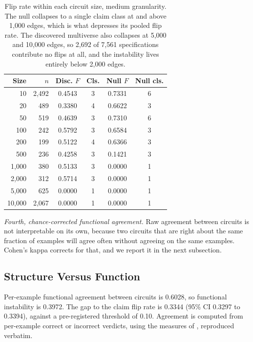 \documentclass[letterpaper]{article} %
\begin{document}
\begin{table}[t]
\centering
\caption{Flip rate within each circuit size, medium granularity. The null
collapses to a single claim class at and above 1{,}000 edges, which is what
depresses its pooled flip rate. The discovered multiverse also collapses at
5{,}000 and 10{,}000 edges, so 2{,}692 of 7{,}561 specifications contribute no
flips at all, and the instability lives entirely below 2{,}000 edges.}
\label{tab:bysize}
\begin{tabular}{rrcccc}
\toprule
Size & $n$ & Disc. $F$ & Cls. & Null $F$ & Null cls. \\
\midrule
10 & 2{,}492 & 0.4543 & 3 & 0.7331 & 6 \\
20 & 489 & 0.3380 & 4 & 0.6622 & 3 \\
50 & 519 & 0.4639 & 3 & 0.7310 & 6 \\
100 & 242 & 0.5792 & 3 & 0.6584 & 3 \\
200 & 199 & 0.5122 & 4 & 0.6366 & 3 \\
500 & 236 & 0.4258 & 3 & 0.1421 & 3 \\
1{,}000 & 380 & 0.5133 & 3 & 0.0000 & 1 \\
2{,}000 & 312 & 0.5714 & 3 & 0.0000 & 1 \\
5{,}000 & 625 & 0.0000 & 1 & 0.0000 & 1 \\
10{,}000 & 2{,}067 & 0.0000 & 1 & 0.0000 & 1 \\
\bottomrule
\end{tabular}
\end{table}

\emph{Fourth, chance-corrected functional agreement.} Raw agreement between
circuits is not interpretable on its own, because two circuits that are right
about the same fraction of examples will agree often without agreeing on the
same examples. Cohen's kappa corrects for that, and we report it in the next
subsection.

\subsection{Structure Versus Function}

Per-example functional agreement between circuits is 0.6028, so functional
instability is 0.3972. The gap to the claim flip rate is 0.3344 (95\% CI 0.3297
to 0.3394), against a pre-registered threshold of 0.10. Agreement is computed
from per-example correct or incorrect verdicts, using the measures of
\citet{bayatmakou2026}, reproduced verbatim.
\end{document}
